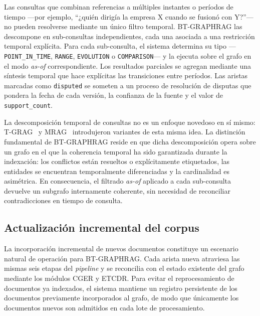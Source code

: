 Las consultas que combinan referencias a múltiples instantes o períodos de tiempo ---por ejemplo, ``¿quién dirigía la empresa X cuando se fusionó con Y?''--- no pueden resolverse mediante un único filtro temporal. BT-GRAPHRAG las descompone en sub-consultas independientes, cada una asociada a una restricción temporal explícita. Para cada sub-consulta, el sistema determina su tipo ---\texttt{POINT\_IN\_TIME}, \texttt{RANGE}, \texttt{EVOLUTION} o \texttt{COMPARISON}--- y la ejecuta sobre el grafo en el modo \emph{as-of} correspondiente. Los resultados parciales se agregan mediante una síntesis temporal que hace explícitas las transiciones entre períodos. Las aristas marcadas como \texttt{disputed} se someten a un proceso de resolución de disputas que pondera la fecha de cada versión, la confianza de la fuente y el valor de \texttt{support\_count}.

La descomposición temporal de consultas no es un enfoque novedoso en sí mismo: T-GRAG~\cite{tgrag2025} y MRAG~\cite{mrag2025} introdujeron variantes de esta misma idea. La distinción fundamental de BT-GRAPHRAG reside en que dicha descomposición opera sobre un grafo en el que la coherencia temporal ha sido garantizada durante la indexación: los conflictos están resueltos o explícitamente etiquetados, las entidades se encuentran temporalmente diferenciadas y la cardinalidad es asimétrica. En consecuencia, el filtrado \emph{as-of} aplicado a cada sub-consulta devuelve un subgrafo internamente coherente, sin necesidad de reconciliar contradicciones en tiempo de consulta.

\subsection{Actualización incremental del corpus}

La incorporación incremental de nuevos documentos constituye un escenario natural de operación para BT-GRAPHRAG. Cada arista nueva atraviesa las mismas seis etapas del \emph{pipeline} y se reconcilia con el estado existente del grafo mediante los módulos CGER y ETCDR. Para evitar el reprocesamiento de documentos ya indexados, el sistema mantiene un registro persistente de los documentos previamente incorporados al grafo, de modo que únicamente los documentos nuevos son admitidos en cada lote de procesamiento.

